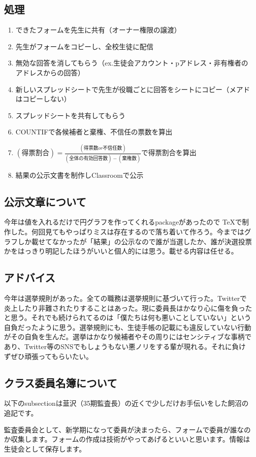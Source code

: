 \documentclass[a4paper]{ltjsreport}
\begin{document}
\subsection{処理}
\begin{enumerate}
  \item できたフォームを先生に共有（オーナー権限の譲渡）
  \item 先生がフォームをコピーし、全校生徒に配信
  \item 無効な回答を消してもらう（ex.生徒会アカウント・pアドレス・非有権者のアドレスからの回答）
  \item 新しいスプレッドシートで先生が役職ごとに回答をシートにコピー（メアドはコピーしない）
  \item スプレッドシートを共有してもらう
  \item COUNTIFで各候補者と棄権、不信任の票数を算出
  \item $(得票割合)=\frac{(得票数or不信任数)}{(全体の有効回答数) - (棄権数)}$で得票割合を算出
  \item 結果の公示文書を制作しClassroomで公示
\end{enumerate}
\subsection{公示文章について}
今年は値を入れるだけで円グラフを作ってくれるpackageがあったので \TeX で制作した。何回見てもやっぱりミスは存在するので落ち着いて作ろう。今まではグラフしか載せてなかったが「結果」の公示なので誰が当選したか、誰が決選投票かをはっきり明記したほうがいいと個人的には思う。載せる内容は任せる。
\subsection{アドバイス}
今年は選挙規則があった。全ての職務は選挙規則に基づいて行った。Twitterで炎上したり非難されたりすることはあった。現に委員長はかなり心に傷を負ったと思う。それでも続けられてるのは「僕たちは何も悪いことしていない」という自負だったように思う。選挙規則にも、生徒手帳の記載にも違反していない行動がその自負を生んだ。選挙はかなり候補者やその周りにはセンシティブな事柄であり、Twitter等のSNSでもしょうもない悪ノリをする輩が現れる。それに負けずぜひ頑張ってもらいたい。
\subsection{クラス委員名簿について}
以下のsubsectionは韮沢（35期監査長）の近くで少しだけお手伝いをした飼沼の追記です。

監査委員会として、新学期になって委員が決まったら、フォームで委員が誰なのか収集します。フォームの作成は技術がやってあげるといいと思います。情報は生徒会として保存します。
\end{document}
